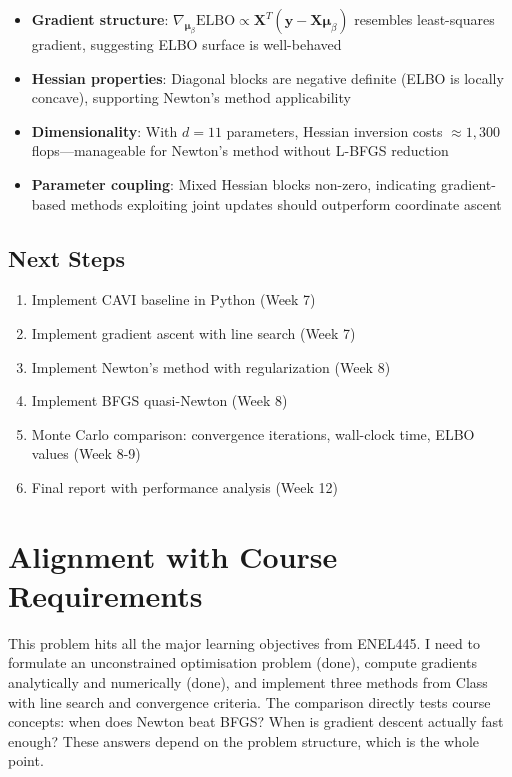 \documentclass[11pt]{article}
\newcommand{\ELBO}{\text{ELBO}}
\begin{document}
\begin{itemize}
\item \textbf{Gradient structure}: $\nabla_{\bm{\mu}_\beta} \ELBO \propto \bm{X}^T(\bm{y} - \bm{X}\bm{\mu}_\beta)$ resembles least-squares gradient, suggesting ELBO surface is well-behaved

\item \textbf{Hessian properties}: Diagonal blocks are negative definite (ELBO is locally concave), supporting Newton's method applicability

\item \textbf{Dimensionality}: With $d=11$ parameters, Hessian inversion costs $\approx 1,300$ flops---manageable for Newton's method without L-BFGS reduction

\item \textbf{Parameter coupling}: Mixed Hessian blocks non-zero, indicating gradient-based methods exploiting joint updates should outperform coordinate ascent
\end{itemize}

\subsection{Next Steps}

\begin{enumerate}
\item Implement CAVI baseline in Python (Week 7)
\item Implement gradient ascent with line search (Week 7)
\item Implement Newton's method with regularization (Week 8)
\item Implement BFGS quasi-Newton (Week 8)
\item Monte Carlo comparison: convergence iterations, wall-clock time, ELBO values (Week 8-9)
\item Final report with performance analysis (Week 12)
\end{enumerate}

\section{Alignment with Course Requirements}

This problem hits all the major learning objectives from ENEL445. I need to formulate an unconstrained optimisation problem (done), compute gradients analytically and numerically (done), and implement three methods from Class with line search and convergence criteria. The comparison directly tests course concepts: when does Newton beat BFGS? When is gradient descent actually fast enough? These answers depend on the problem structure, which is the whole point.
\end{document}
